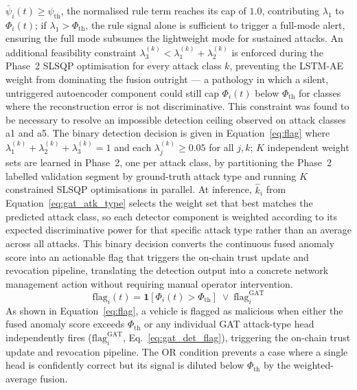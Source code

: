 \documentclass[12pt, a4paper]{report}
\begin{document}
$\bar{\psi}_i(t) \geq \psi_{\mathrm{th}}$, the normalised rule term
reaches its cap of $1.0$, contributing $\lambda_1$ to $\Phi_i(t)$;
if $\lambda_1 > \Phi_{\mathrm{th}}$, the rule signal alone is
sufficient to trigger a full-mode alert, ensuring the full mode
subsumes the lightweight mode for sustained attacks.
An additional feasibility constraint $\lambda_3^{(k)} < \lambda_1^{(k)}
+ \lambda_2^{(k)}$ is enforced during the Phase~2 SLSQP optimisation
for every attack class $k$, preventing the LSTM-AE weight from
dominating the fusion outright --- a pathology in which a silent,
untriggered autoencoder component could still cap $\Phi_i(t)$ below
$\Phi_{\mathrm{th}}$ for classes where the reconstruction error is not
discriminative. This constraint was found to be necessary to resolve
an impossible detection ceiling observed on attack classes a1 and a5.
\newline
\newline
The binary detection decision is given in
Equation~\ref{eq:flag} where $\lambda_1^{(k)} + \lambda_2^{(k)} + \lambda_3^{(k)} = 1$ and
each $\lambda_j^{(k)} \geq 0.05$ for all $j, k$; $K$ independent
weight sets are learned in Phase~2, one per attack class, by
partitioning the Phase~2 labelled validation segment by ground-truth
attack type and running $K$ constrained SLSQP optimisations in
parallel. At inference, $\hat{k}_i$ from Equation~\ref{eq:gat_atk_type}
selects the weight set that best matches the predicted attack class,
so each detector component is weighted according to its expected
discriminative power for that specific attack type rather than an
average across all attacks.
\newline
\newline
This binary decision converts the continuous fused anomaly score
into an actionable flag that triggers the on-chain trust update and
revocation pipeline, translating the detection output into a concrete
network management action without requiring manual operator
intervention.
\begin{equation}
  \mathrm{flag}_i(t) = \mathbf{1}\!\left[\Phi_i(t) > \Phi_{\mathrm{th}}\right]
    \;\lor\; \mathrm{flag}_i^{\mathrm{GAT}}
  \label{eq:flag}
\end{equation}
As shown in Equation~\ref{eq:flag}, a vehicle is flagged as malicious
when either the fused anomaly score exceeds $\Phi_{\mathrm{th}}$ or any
individual GAT attack-type head independently fires
($\mathrm{flag}_i^{\mathrm{GAT}}$, Eq.~\ref{eq:gat_det_flag}), triggering
the on-chain trust update and revocation pipeline. The OR condition
prevents a case where a single head is confidently correct but its
signal is diluted below $\Phi_{\mathrm{th}}$ by the weighted-average
fusion.
\end{document}
